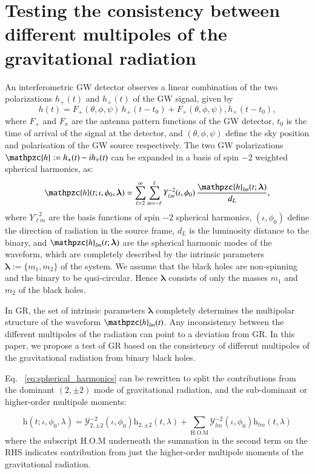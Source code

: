 \documentclass[prd,preprintnumbers,twocolumn,eqsecnum,floatfix,a4paper,nofootinbib,superscriptaddress]{revtex4}
\newcommand{\h}{\mathpzc{h}}
\newcommand{\Ylm}{{Y}^{-2}_{\ell m}}
\newcommand{\blambda}{\bm{\lambda}}
\begin{document}
\section{Testing the consistency between different multipoles of the gravitational radiation}
An interferometric GW detector observes a linear combination of the two polarizations $h_+(t)$ and $h_\times(t)$ of the GW signal, given by 
\begin{equation}
h(t) = F_+(\theta, \phi, \psi) \, h_+(t-t_0) + F_{\times}(\theta, \phi, \psi), {h}_{\times}(t-t_0), 
\end{equation}
where $F_+$ and $F_x$ are the antenna pattern functions of the GW detector, $t_0$ is the time of arrival of the signal at the detector, and $(\theta, \phi, \psi)$ define the sky position and polarisation of the GW source respectively. The two GW polarizations $\h := h_+(t) -i h_\times(t)$ can be expanded in a basis of spin $-2$ weighted spherical harmonics, as:
\begin{equation}
\h(t; \iota, \phi_0, \blambda) = \sum _{\ell=2}^{\infty} \sum _{m=-\ell}^{\ell} \Ylm (\iota, \phi_0) \, \frac{{\h}_{lm}(t; \blambda)}{d_L}, 
\label{eq:spherical_harmonics}
\end{equation}
where $\Ylm$ are the basis functions of spin $-2$ spherical harmonics, $(\iota, \phi_0)$ define the direction of radiation in the source frame, $d_L$ is  the luminosity distance to the binary, and 
${\h}_{lm}(t; \blambda)$ are the spherical harmonic modes of the waveform, which are completely described by the intrinsic parameters $\blambda := \{m_1, m_2\}$ of the system. We assume that the black holes are non-spinning and the binary to be qusi-circular. Hence $\blambda$ consists of only the masses $m_1$ and $m_2$ of the black holes. 

In GR, the set of intrinsic parameters $\blambda$ completely determines the multipolar structure of the waveform ${\h}_{lm}(t)$. Any inconsistency between the different multipoles of the radiation can point to a deviation from GR. In this paper, we propose a test of GR based on the consistency of different multipoles of the gravitational radiation from binary black holes. 

Eq. ~\ref{eq:spherical_harmonics} can be rewritten to split the contributions from the dominant $(2,\pm 2)$ mode of gravitational radiation, and the sub-dominant or higher-order multipole moments:

\begin{equation}
\mathrm{h}(t; \iota, \phi_0, \lambda) = \mathcal{Y}_{2,\pm 2}^{-2} (\iota, \phi_0)\mathrm{h}_{2,\pm 2}(t, \lambda) + \sum _{\text{H.O.M}} \mathcal{Y}_{lm}^{-2} (\iota, \phi_0)\mathrm{h}_{lm}(t, \lambda)
\label{eq:test_HM}
\end{equation}
where the subscript H.O.M underneath the summation in the second term on the RHS indicates contribution from just the higher-order multipole moments of the gravitational radiation.
\end{document}
